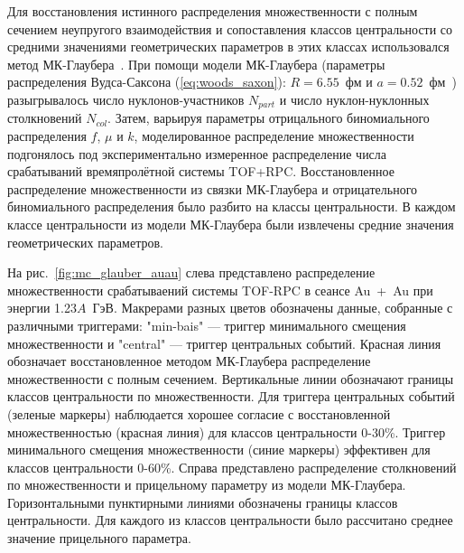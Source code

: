 Для восстановления истинного распределения множественности с полным сечением неупругого взаимодействия и сопоставления классов центральности со средними значениями геометрических параметров в этих классах использовался метод МК-Глаубера~\cite{HADES:2017def}.
При помощи модели МК-Глаубера (параметры распределения Вудса-Саксона (\ref{eq:woods_saxon}): $R=6.55$~фм и $a=0.52$~фм~\cite{LandoltBornstein2004:sm_lbs_978-3-540-45555-4_81}) разыгрывалось число нуклонов-участников $N_{part}$ и число нуклон-нуклонных столкновений $N_{col}$.
Затем, варьируя параметры отрицального биномиального распределения $f$, $\mu$ и $k$, моделированное распределение множественности подгонялось под экспериментально измеренное распределение числа срабатываний времяпролётной системы TOF+RPC.
Восстановленное распределение множественности из связки МК-Глаубера и отрицательного биномиального распределения было разбито на классы центральности.
В каждом классе центральности из модели МК-Глаубера были извлечены средние значения геометрических параметров.

На рис.~\ref{fig:mc_glauber_auau} слева представлено распределение множественности срабатываений системы TOF-RPC в сеансе Au~+~Au при энергии 1.23$A$~ГэВ. Макрерами разных цветов обозначены данные, собранные с различными триггерами: "min-bais" --- триггер минимального смещения множественности и "central" --- триггер центральных событий.
Красная линия обозначает восстановленное методом МК-Глаубера распределение множественности с полным сечением.
Вертикальные линии обозначают границы классов центральности по множественности.
Для триггера центральных событий (зеленые маркеры) наблюдается хорошее согласие с восстановленной множественностью (красная линия) для классов центральности 0-30\%.
Триггер минимального смещения множественности (синие маркеры) эффективен для классов центральности 0-60\%.
Справа представлено распределение столкновений по множественности и прицельному параметру из модели МК-Глаубера. 
Горизонтальными пунктирными линиями обозначены границы классов центральности.
Для каждого из классов центральности было рассчитано среднее значение прицельного параметра.


